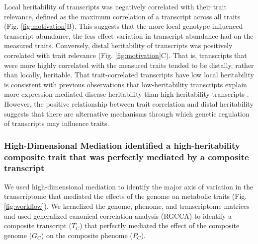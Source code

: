 \documentclass[
]{article}
\begin{document}
Local heritability of transcripts was negatively correlated with their
trait relevance, defined as the maximum correlation of a transcript
across all traits (Fig. \ref{fig:motivation}B). This suggests that the
more local genotype influenced transcript abundance, the less effect
variation in transcript abundance had on the measured traits.
Conversely, distal heritability of transcripts was positively correlated
with trait relevance (Fig. \ref{fig:motivation}C). That is, transcripts
that were more highly correlated with the measured traits tended to be
distally, rather than locally, heritable. That trait-correlated
transcripts have low local heritability is consistent with previous
observations that low-heritability transcripts explain more
expression-mediated disease heritability than high-heritability
transcripts \cite{pmid32424349}. However, the positive relationship
between trait correlation and distal heritability suggests that there
are alternative mechanisms through which genetic regulation of
transcripts may influence traits.

\subsubsection{High-Dimensional Mediation identified a high-heritability
composite trait that was perfectly mediated by a composite
transcript}\label{high-dimensional-mediation-identified-a-high-heritability-composite-trait-that-was-perfectly-mediated-by-a-composite-transcript}

We used high-dimensional mediation to identify the major axis of
variation in the transcriptome that mediated the effects of the genome
on metabolic traits (Fig. \ref{fig:workflow}). We kernelized the genome,
phenome, and transcriptome matrices and used generalized canonical
correlation analysis (RGCCA) \cite{rgcca} to identify a composite
transcript (\(T_C\)) that perfectly mediated the effect of the composite
genome (\(G_C\)) on the composite phenome (\(P_C\)).
\end{document}
